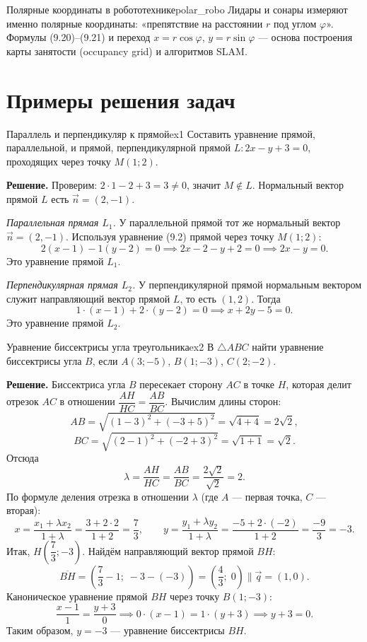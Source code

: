 \documentclass[12pt,a4paper]{article}
\begin{document}
\begin{remarkIT}{Полярные координаты в робототехнике}{polar_robo}
  Лидары и сонары измеряют именно полярные координаты: «препятствие на
  расстоянии $r$ под углом $\varphi$». Формулы (9.20)--(9.21) и переход
  $x = r\cos\varphi$, $y = r\sin\varphi$ — основа построения карты
  занятости (occupancy grid) и алгоритмов SLAM.
\end{remarkIT}

\section*{Примеры решения задач}

\begin{exampleBox}{Параллель и перпендикуляр к прямой}{ex1}
  Составить уравнение прямой, параллельной, и прямой, перпендикулярной
  прямой $L: 2x - y + 3 = 0$, проходящих через точку $M(1; 2)$.

  \textbf{Решение.} Проверим: $2\cdot 1 - 2 + 3 = 3 \neq 0$, значит
  $M \notin L$. Нормальный вектор прямой $L$ есть $\vec{n} = (2, -1)$.

  \emph{Параллельная прямая $L_1$.} У параллельной прямой тот же нормальный
  вектор $\vec{n} = (2, -1)$. Используя уравнение (9.2) прямой через точку
  $M(1; 2)$:
  \[
    2(x - 1) - 1(y - 2) = 0 \implies 2x - 2 - y + 2 = 0
    \implies 2x - y = 0.
  \]
  Это уравнение прямой $L_1$.

  \emph{Перпендикулярная прямая $L_2$.} У перпендикулярной прямой
  нормальным вектором служит направляющий вектор прямой $L$, то есть
  $(1, 2)$. Тогда
  \[
    1\cdot(x - 1) + 2\cdot(y - 2) = 0 \implies x + 2y - 5 = 0.
  \]
  Это уравнение прямой $L_2$.
\end{exampleBox}

\begin{exampleBox}{Уравнение биссектрисы угла треугольника}{ex2}
  В $\triangle ABC$ найти уравнение биссектрисы угла $B$, если
  $A(3; -5)$, $B(1; -3)$, $C(2; -2)$.

  \textbf{Решение.} Биссектриса угла $B$ пересекает сторону $AC$ в точке
  $H$, которая делит отрезок $AC$ в отношении
  $\dfrac{AH}{HC} = \dfrac{AB}{BC}$. Вычислим длины сторон:
  \[
    AB = \sqrt{(1 - 3)^2 + (-3 + 5)^2} = \sqrt{4 + 4} = 2\sqrt{2},
  \]
  \[
    BC = \sqrt{(2 - 1)^2 + (-2 + 3)^2} = \sqrt{1 + 1} = \sqrt{2}.
  \]
  Отсюда
  \[
    \lambda = \frac{AH}{HC} = \frac{AB}{BC}
    = \frac{2\sqrt{2}}{\sqrt{2}} = 2.
  \]
  По формуле деления отрезка в отношении $\lambda$
  (где $A$ — первая точка, $C$ — вторая):
  \[
    x = \frac{x_1 + \lambda x_2}{1 + \lambda}
    = \frac{3 + 2\cdot 2}{1 + 2} = \frac{7}{3}, \qquad
    y = \frac{y_1 + \lambda y_2}{1 + \lambda}
    = \frac{-5 + 2\cdot(-2)}{1 + 2} = \frac{-9}{3} = -3.
  \]
  Итак, $H\left(\dfrac{7}{3}; -3\right)$. Найдём направляющий вектор прямой
  $BH$:
  \[
    \overline{BH} = \left(\frac{7}{3} - 1;\; -3 - (-3)\right)
    = \left(\frac{4}{3};\; 0\right) \parallel \vec{q} = (1, 0).
  \]
  Каноническое уравнение прямой $BH$ через точку $B(1; -3)$:
  \[
    \frac{x - 1}{1} = \frac{y + 3}{0} \implies 0\cdot(x - 1) = 1\cdot(y + 3)
    \implies y + 3 = 0.
  \]
  Таким образом, $y = -3$ — уравнение биссектрисы $BH$.
\end{exampleBox}
\end{document}

